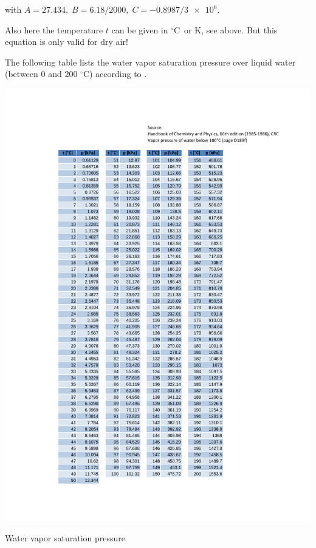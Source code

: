 \documentclass[11pt,a4paper,english,twoside]{scrreprt}
\newcommand{\gradC}{${}^\circ$C}      %
\begin{document}
with $A = \num{27.434},\; B = \num{6.18}/\num{2000},\; C = \num{-0.8987}/\num{3e6}$.

Also here the temperature $t$ can be given in \gradC\ or K, see above. But this equation is only valid for dry air!

\newpage

The following table lists the water vapor saturation pressure over liquid water (between 0 and 200 \gradC) according to \cite{HCP}.

\begin{table}
  \centering
  \includegraphics*[height=\textheight,angle=0]{FCF_Tab_pws.pdf}
  \caption[Water vapor saturation pressure]{Water vapor saturation pressure}
  \label{table:pws}
\end{table}


\newpage
\end{document}
